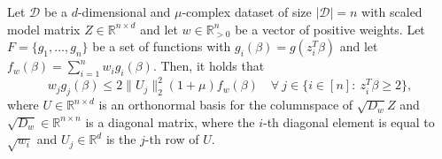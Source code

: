 \begin{lemma}
    \label{lemma:g-bounds-1}
    Let $\mathcal{D}$ be a $d$-dimensional and $\mu$-complex dataset of size
    $|\mathcal{D}|=n$ with scaled model matrix
    $Z \in \mathbb{R}^{n \times d}$ and let $w \in \mathbb{R}^n_{>0}$
    be a vector of positive weights.
    Let $F = \{g_1, ..., g_n\}$ be a set of functions with
    $g_i(\beta) = g(z_i^T \beta)$ and let
    $f_w(\beta) = \sum_{i=1}^n w_ig_i(\beta)$.
    Then, it holds that
    \begin{equation*}
        w_jg_j(\beta) \leq 2 \lVert U_j \rVert_2^2(1 + \mu)f_w(\beta) \quad
        \forall\ j \in \{i \in [n]:\ z_i^T \beta \geq 2 \},
    \end{equation*}
    where $U \in \mathbb{R}^{n \times d}$ is an orthonormal basis for
    the columnspace of $\sqrt{D_w}Z$ and $\sqrt{D_w} \in \mathbb{R}^{n \times n}$
    is a diagonal matrix, where the $i$-th diagonal element is equal to
    $\sqrt{w_i}$ and $U_j \in \mathbb{R}^d$ is the $j$-th row of $U$.
\end{lemma}
